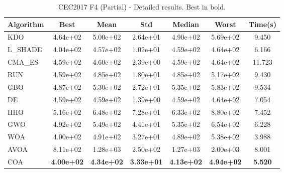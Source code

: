 \begin{table}[H]
\centering\small
\caption{CEC2017 F4 (Partial) - Detailed results. Best in bold.}
\label{tab:cec2017_F4}
\begin{tabular}{lcccccc}
\toprule
\textbf{Algorithm} & \textbf{Best} & \textbf{Mean} & \textbf{Std} & \textbf{Median} & \textbf{Worst} & \textbf{Time(s)} \\
\midrule
KDO & 4.64e+02 & 5.00e+02 & 2.64e+01 & 4.90e+02 & 5.69e+02 & 9.450 \\
L_SHADE & 4.04e+02 & 4.57e+02 & 1.02e+01 & 4.59e+02 & 4.64e+02 & 6.166 \\
CMA_ES & 4.59e+02 & 4.60e+02 & 2.39e+00 & 4.59e+02 & 4.64e+02 & 11.723 \\
RUN & 4.59e+02 & 4.85e+02 & 1.80e+01 & 4.85e+02 & 5.17e+02 & 9.430 \\
GBO & 4.87e+02 & 5.30e+02 & 2.72e+01 & 5.35e+02 & 5.83e+02 & 9.534 \\
DE & 4.59e+02 & 4.59e+02 & 1.39e+00 & 4.59e+02 & 4.64e+02 & 7.054 \\
HHO & 5.16e+02 & 6.48e+02 & 7.28e+01 & 6.33e+02 & 8.80e+02 & 7.452 \\
GWO & 4.92e+02 & 5.49e+02 & 4.41e+01 & 5.35e+02 & 6.54e+02 & 6.228 \\
WOA & 4.00e+02 & 4.91e+02 & 3.27e+01 & 4.89e+02 & 5.38e+02 & 3.988 \\
AVOA & 8.11e+02 & 1.28e+03 & 2.50e+02 & 1.27e+03 & 2.00e+03 & 8.001 \\
COA & \textbf{4.00e+02} & \textbf{4.34e+02} & \textbf{3.33e+01} & \textbf{4.13e+02} & \textbf{4.94e+02} & \textbf{5.520} \\
\bottomrule
\end{tabular}
\end{table}
